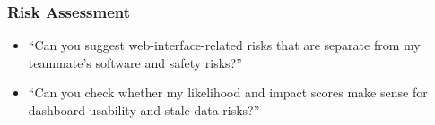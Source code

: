 \documentclass[11pt, twoside, a4paper]{article}
\begin{document}
\subsubsection*{Risk Assessment}
\begin{itemize}
    \item ``Can you suggest web-interface-related risks that are separate from my teammate's software and safety risks?''
    \item ``Can you check whether my likelihood and impact scores make sense for dashboard usability and stale-data risks?''
\end{itemize}
\end{document}
